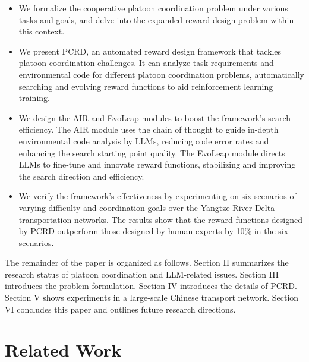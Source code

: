 \documentclass[lettersize,journal]{IEEEtran}
\begin{document}
\begin{itemize}
    \item We formalize the cooperative platoon coordination problem under various tasks and goals, and delve into the expanded reward design problem within this context.
    \item We present PCRD, an automated reward design framework that tackles platoon coordination challenges. It can analyze task requirements and environmental code for different platoon coordination problems, automatically searching and evolving reward functions to aid reinforcement learning training.
    \item We design the AIR and EvoLeap modules to boost the framework's search efficiency. 
     The AIR module uses the chain of thought to guide in-depth environmental code analysis by LLMs, reducing code error rates and enhancing the search starting point quality. 
     The EvoLeap module directs LLMs to fine-tune and innovate reward functions, stabilizing and improving the search direction and efficiency.
    \item We verify the framework's effectiveness by experimenting on  six scenarios of varying difficulty and coordination goals over the Yangtze River Delta transportation networks. 
    The results show that the reward functions designed by PCRD outperform those designed by human experts by 10\% in the six scenarios.
\end{itemize}

The remainder of the paper is organized as follows.
Section II summarizes the research status of platoon coordination and LLM-related issues. 
Section III introduces the problem formulation.
Section IV introduces the details of PCRD.
Section V shows experiments in a large-scale Chinese transport network. 
Section VI concludes this paper and outlines future research directions.


\section{Related Work}
\end{document}
